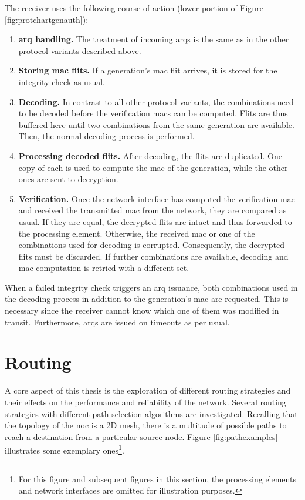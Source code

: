 The receiver uses the following course of action (lower portion of Figure \ref{fig:protchartgenauth}):
\begin{enumerate}
    \item \textbf{\Gls{arq} handling.} The treatment of incoming \glspl{arq} is the same as in the other protocol variants described above.
    \item \textbf{Storing \gls{mac} flits.} If a generation's \gls{mac} flit arrives, it is stored for the integrity check as usual.
    \item \textbf{Decoding.} In contrast to all other protocol variants, the combinations need to be decoded before the verification \glspl{mac} can
        be computed. Flits are thus buffered here until two combinations from the same generation are available. Then, the normal decoding process is
        performed.
    \item \textbf{Processing decoded flits.} After decoding, the flits are duplicated. One copy of each is used to compute the \gls{mac} of the
        generation, while the other ones are sent to decryption.
    \item \textbf{Verification.} Once the network interface has computed the verification \gls{mac} and received the transmitted \gls{mac} from the
        network, they are compared as usual. If they are equal, the decrypted flits are intact and thus forwarded to the processing element.
        Otherwise, the received \gls{mac} or one of the combinations used for decoding is corrupted. Consequently, the decrypted flits must be
        discarded. If further combinations are available, decoding and \gls{mac} computation is retried with a different set.
\end{enumerate}
\vspace{0.5\baselineskip}

When a failed integrity check triggers an \gls{arq} issuance, both combinations used in the decoding process in addition to the generation's
\gls{mac} are requested. This is necessary since the receiver cannot know which one of them was modified in transit. Furthermore, \glspl{arq} are
issued on timeouts as per usual.

\section{Routing}
A core aspect of this thesis is the exploration of different routing strategies and their effects on the performance and reliability of
the network. Several routing strategies with different path selection algorithms are investigated. Recalling that the topology of the
\gls{noc} is a 2D mesh, there is a multitude of possible paths to reach a destination from a particular source node. Figure \vref{fig:pathexamples}
illustrates some exemplary ones\footnote{For this figure and subsequent figures in this section, the processing elements and network interfaces are
omitted for illustration purposes.}.

